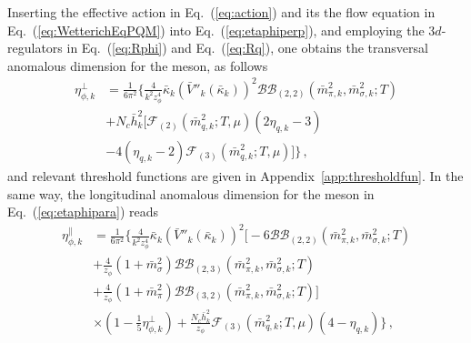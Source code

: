 \documentclass[%
reprint,
superscriptaddress,
showpacs,preprintnumbers,
 amsmath,amssymb,
 aps,
prd,
]{revtex4-1}
\def\Eq#1{Eq.~(\ref{#1})}
\def\app#1{Appendix~\ref{#1}}
\begin{document}
Inserting the effective action in \Eq{eq:action} and its the flow equation in \Eq{eq:WetterichEqPQM} into \Eq{eq:etaphiperp}, and employing the $3d$- regulators in \Eq{eq:Rphi} and \Eq{eq:Rq}, one obtains the transversal anomalous dimension for the meson, as follows
\begin{align}
  \eta_{\phi,k}^{\perp}&=\frac{1}{6\pi^2}\Bigg\{\frac{4}{k^2 z_\phi^4} \bar{\kappa}_k(\bar{V}''_k(\bar{\kappa}_k))^2\mathcal{BB}_{(2,2)}(\bar{m}^{2}_{\pi,k},\bar{m}^{2}_{\sigma,k};T)\nonumber\\[2ex]
&+N_c\bar{h}^{2}_{k}\bigg[\mathcal{F}_{(2)}(\bar{m}^{2}_{q,k};T,\mu)(2\eta_{q,k}-3)\nonumber\\[2ex]
&-4(\eta_{q,k}-2)\mathcal{F}_{(3)}(\bar{m}^2_{q,k};T,\mu)\bigg]\Bigg\}\,, \label{eq:etaphiperp2}  
\end{align} 
and relevant threshold functions are given in \app{app:thresholdfun}. In the same way, the longitudinal anomalous dimension for the meson in \Eq{eq:etaphipara} reads
\begin{align}
  \eta_{\phi,k}^{\parallel}&=\frac{1}{6\pi^2}\Bigg\{\frac{4}{k^2 z_\phi^4}\bar{\kappa}_k(\bar{V}''_k(\bar{\kappa}_k))^2\bigg[-6\mathcal{BB}_{(2,2)}(\bar{m}^{2}_{\pi,k},\bar{m}^{2}_{\sigma,k};T)\nonumber\\[2ex]
&+\frac{4}{z_\phi}(1+\bar{m}^{2}_{\sigma}){\mathcal{BB}}_{(2,3)}(\bar{m}^{2}_{\pi,k},\bar{m}^{2}_{\sigma,k};T)\nonumber\\[2ex]
&+\frac{4}{z_\phi}(1+\bar{m}^{2}_{\pi}){\mathcal{BB}}_{(3,2)}(\bar{m}^{2}_{\pi,k},\bar{m}^{2}_{\sigma,k};T)\bigg]\nonumber\\[2ex]
&\times(1-\frac{1}{5}\eta^{\bot}_{\phi,k})+\frac{N_c\bar{h}^{2}_{k}}{z_\phi}\mathcal{F}_{(3)}(\bar{m}^{2}_{q,k};T,\mu)(4-\eta_{q,k})\bigg\}\,, \label{eq:etaphipara2}  
\end{align} 
\end{document}
